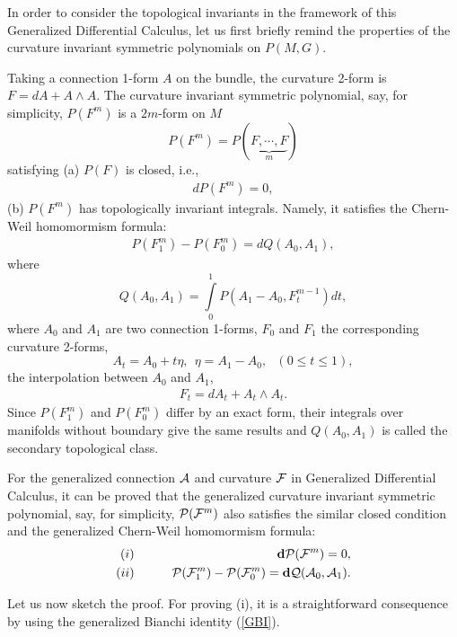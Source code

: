 \documentclass[a4paper,twocolumn,showpacs,prd]{revtex4}
\begin{document}
 In order to consider the topological invariants
in the framework of this Generalized Differential Calculus, let us
first briefly remind the properties of the curvature invariant
symmetric polynomials on $P(M,G)$.


Taking a connection 1-form $A$ on the bundle, the curvature 2-form
is $F= dA + A \wedge A$. The curvature invariant  symmetric
polynomial, say, for simplicity, $P(F^m)$ is a $2m$-form on $M$
\begin{equation}
P(F^m) = P(\underbrace{F,\cdots, F}_m)
\end{equation}
satisfying (a) $P(F)$ is  closed, i.e.,
\begin{eqnarray}
dP(F^m) = 0,
\end{eqnarray}
(b) $P(F^m)$ has topologically invariant integrals.  Namely, it
satisfies the Chern-Weil homomormism formula:
\begin{eqnarray}\label{CW} P(F^m_1) -
P(F^m_0) = dQ(A_0, A_1),
\end{eqnarray} where
\begin{equation}
 Q(A_0, A_1) = \int\limits^1_0
P(A_1- A_0, F^{m-1}_t) dt,
\end{equation}
where $A_0$ and $A_1$ are two connection 1-forms, $F_0$ and $F_1$
the corresponding curvature 2-forms,
\begin{equation}
A_t = A_0 + t\eta,~~\eta = A_1 - A_0,~~~ (0\leq t
\leq 1),
\end{equation}
 the interpolation between $A_0$ and
$A_1$,
\begin{eqnarray}
F_t = dA_t + A_t \wedge A_t .
\end{eqnarray}
Since %
$P(F^m_1)$ and $P(F^m_0)$ differ by  an exact form, their
integrals over manifolds without boundary give the same results
and $ Q(A_0, A_1)$ is called the secondary topological class.

For the generalized connection ${\cal A}$ and curvature ${\cal F}$
in Generalized Differential Calculus, it can be proved that the
generalized curvature invariant symmetric polynomial, say, for
simplicity, ${\cal P}({\cal F}^m)$ also satisfies the similar
closed condition and the generalized Chern-Weil homomormism
formula:
\begin{eqnarray}
(i) \qquad&& {\bf d}{\cal P}({\cal F}^m)=0 , \\
(ii) \qquad&& {\cal P}({\cal F}^m_1)-{\cal P}({\cal F}^m_0)=
{\bf d}{\cal Q}({\cal A}_0, {\cal A}_1). \label{cs}
\end{eqnarray}

Let us now sketch the proof. For proving (i), it is a
straightforward consequence by using the generalized Bianchi
identity (\ref{GBI}).
\end{document}
